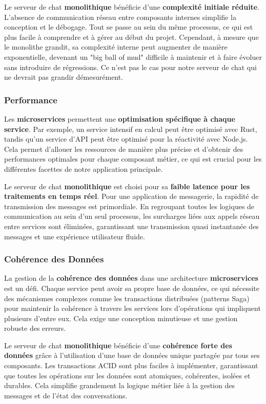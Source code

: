 \documentclass[12pt]{rapportPfe}
\begin{document}
Le serveur de chat \textbf{monolithique} bénéficie d'une \textbf{complexité initiale réduite}. L'absence de communication réseau entre composants internes simplifie la conception et le débogage. Tout se passe au sein du même processus, ce qui est plus facile à comprendre et à gérer au début du projet. Cependant, à mesure que le monolithe grandit, sa complexité interne peut augmenter de manière exponentielle, devenant un "big ball of mud" difficile à maintenir et à faire évoluer sans introduire de régressions. Ce n'est pas le cas pour notre serveur de chat qui ne devrait pas grandir démesurément.

\subsubsection{Performance}

Les \textbf{microservices} permettent une \textbf{optimisation spécifique à chaque service}. Par exemple, un service intensif en calcul peut être optimisé avec Rust, tandis qu'un service d'API peut être optimisé pour la réactivité avec Node.js. Cela permet d'allouer les ressources de manière plus précise et d'obtenir des performances optimales pour chaque composant métier, ce qui est crucial pour les différentes facettes de notre application principale.

Le serveur de chat \textbf{monolithique} est choisi pour sa \textbf{faible latence pour les traitements en temps réel}. Pour une application de messagerie, la rapidité de transmission des messages est primordiale. En regroupant toutes les logiques de communication au sein d'un seul processus, les surcharges liées aux appels réseau entre services sont éliminées, garantissant une transmission quasi instantanée des messages et une expérience utilisateur fluide.

\subsubsection{Cohérence des Données}

La gestion de la \textbf{cohérence des données} dans une architecture \textbf{microservices} est un défi. Chaque service peut avoir sa propre base de données, ce qui nécessite des mécanismes complexes comme les transactions distribuées (patterns Saga) pour maintenir la cohérence à travers les services lors d'opérations qui impliquent plusieurs d'entre eux. Cela exige une conception minutieuse et une gestion robuste des erreurs.

Le serveur de chat \textbf{monolithique} bénéficie d'une \textbf{cohérence forte des données} grâce à l'utilisation d'une base de données unique partagée par tous ses composants. Les transactions ACID sont plus faciles à implémenter, garantissant que toutes les opérations sur les données sont atomiques, cohérentes, isolées et durables. Cela simplifie grandement la logique métier liée à la gestion des messages et de l'état des conversations.
\end{document}
